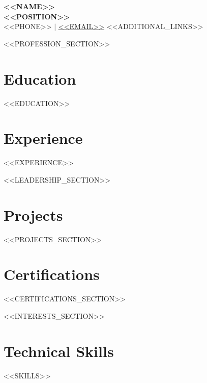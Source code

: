 \documentclass[11pt,a4paper]{article}
\newcommand{\resumeSubHeadingListStart}{\begin{itemize}[leftmargin=0.15in, label={}]}
\newcommand{\resumeSubHeadingListEnd}{\end{itemize}}
\begin{document}
\begin{center}
    \textbf{\Huge \scshape <<NAME>>} \\ \vspace{1pt}
    \textbf{\large \scshape <<POSITION>>} \\ \vspace{1pt}
    \small <<PHONE>> $|$ \href{mailto:<<EMAIL>>}{\underline{<<EMAIL>>}}
    <<ADDITIONAL_LINKS>>
\end{center}

<<PROFESSION_SECTION>>

\section{Education}
  \resumeSubHeadingListStart
    <<EDUCATION>>
  \resumeSubHeadingListEnd

\section{Experience}
  \resumeSubHeadingListStart
    <<EXPERIENCE>>
  \resumeSubHeadingListEnd

<<LEADERSHIP_SECTION>>

\section{Projects}
\resumeSubHeadingListStart
<<PROJECTS_SECTION>>
\resumeSubHeadingListEnd

\section{Certifications}
\resumeSubHeadingListStart
<<CERTIFICATIONS_SECTION>>
\resumeSubHeadingListEnd

<<INTERESTS_SECTION>>

\section{Technical Skills}
 \begin{itemize}[leftmargin=0.15in, label={}]
    \small{\item{
     <<SKILLS>>
    }}
 \end{itemize}

\end{document}
